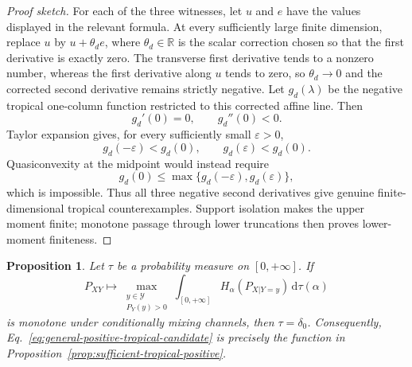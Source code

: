 \documentclass[aps,pra,11pt,onecolumn,nofootinbib,tightenlines]{revtex4-2}
\newtheorem{proposition}[theorem]{Proposition}
\theoremstyle{definition}
\def \d {\mathrm{d}}
\newcommand{\Y}{\mathcal{Y}}
\newcommand{\R}{\mathbb{R}}
\begin{document}
\begin{proof}[Proof sketch]
For each of the three witnesses, let $u$ and $e$ have the values displayed in
the relevant formula.  At every sufficiently large finite dimension, replace
$u$ by $u+\theta_de$, where $\theta_d\in\R$ is the scalar correction chosen
so that the first derivative is exactly zero.  The transverse first derivative
tends to a nonzero number,
whereas the first derivative along $u$ tends to zero, so $\theta_d\to0$ and the
corrected second derivative remains strictly negative.  Let $g_d(\lambda)$ be
the negative tropical one-column function restricted to this corrected affine
line.  Then
\begin{equation}
g_d'(0)=0,
\qquad
g_d''(0)<0.
\label{eq:tropical-exact-negative-curvature}
\end{equation}
Taylor expansion gives, for every sufficiently small $\varepsilon>0$,
\begin{equation}
g_d(-\varepsilon)<g_d(0),
\qquad
g_d(\varepsilon)<g_d(0).
\label{eq:tropical-endpoint-strict-inequalities}
\end{equation}
Quasiconvexity at the midpoint would instead require
\begin{equation}
g_d(0)\leq
\max\{g_d(-\varepsilon),g_d(\varepsilon)\},
\label{eq:tropical-quasiconvex-midpoint}
\end{equation}
which is impossible.  Thus all three negative second derivatives give genuine
finite-dimensional tropical counterexamples.  Support isolation makes the
upper moment finite; monotone passage through lower truncations then proves
lower-moment finiteness.
\end{proof}

\begin{proposition}
\label{prop:positive-tropical-necessary}
Let $\tau$ be a probability measure on $[0,+\infty]$.  If
\begin{equation}
\label{eq:general-positive-tropical-candidate}
P_{XY}\longmapsto
\max_{\substack{y\in\Y\\P_Y(y)>0}}
\int_{[0,+\infty]}H_\alpha(P_{X|Y=y})\,\d\tau(\alpha)
\end{equation}
is monotone under conditionally mixing channels, then $\tau=\delta_0$.
Consequently, Eq.~\eqref{eq:general-positive-tropical-candidate} is precisely
the function in Proposition~\ref{prop:sufficient-tropical-positive}.
\end{proposition}
\end{document}
